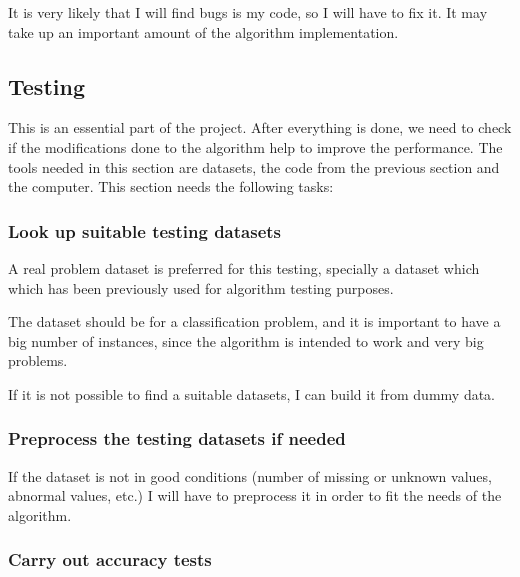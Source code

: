 \documentclass[a4paper]{article}
\begin{document}
        It is very likely that I will find bugs is my code, so I will have to fix it. It may take up an important amount of the algorithm implementation.



        \subsection{Testing}

        This is an essential part of the project. After everything is done, we need to check if the modifications done to the algorithm help to improve the performance. The tools needed in this section are datasets, the code from the previous section and the computer. This section needs the following tasks:

        \subsubsection{Look up suitable testing datasets}

        A real problem dataset is preferred for this testing, specially a dataset which which has been previously used for algorithm testing purposes.

        The dataset should be for a classification problem, and it is important to have a big number of instances, since the algorithm is intended to work and very big problems.

        If it is not possible to find a suitable datasets, I can build it from dummy data.

        \subsubsection{Preprocess the testing datasets if needed}

        If the dataset is not in good conditions (number of missing or unknown values, abnormal values, etc.) I will have to preprocess it in order to fit the needs of the algorithm.

        \subsubsection{Carry out accuracy tests}
\end{document}
